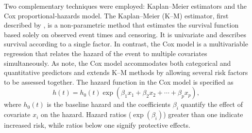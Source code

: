 \documentclass[12pt]{article}
\begin{document}
Two complementary techniques were employed: Kaplan–Meier estimators and the Cox proportional‑hazards model.  The Kaplan–Meier (K–M) estimator, first described by \citet{dudley2016kaplan}, is a non‑parametric method that estimates the survival function based solely on observed event times and censoring.  It is univariate and describes survival according to a single factor.  In contrast, the Cox model is a multivariable regression that relates the hazard of the event to multiple covariates simultaneously.  As \citet{sthda_cox} note, the Cox model accommodates both categorical and quantitative predictors and extends K–M methods by allowing several risk factors to be assessed together.  The hazard function in the Cox model is specified as
\[ h(t) = h_0(t) \exp(\beta_1 x_1 + \beta_2 x_2 + \cdots + \beta_p x_p), \]
where \(h_0(t)\) is the baseline hazard and the coefficients \(\beta_i\) quantify the effect of covariate \(x_i\) on the hazard.  Hazard ratios (\(\exp(\beta_i)\)) greater than one indicate increased risk, while ratios below one signify protective effects.
\end{document}

